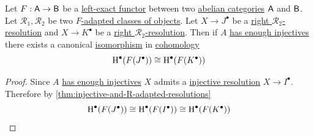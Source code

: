 \documentclass[../../../main]{subfiles}
\begin{document}
\begin{corollary}
  Let \(F: \mathsf{A} \to \mathsf{B}\) be a \hyperref[def:exact-functor]{left-exact functor} between two \hyperref[def:abelian-category]{abelian categories} \(\mathsf{A}\) and \(\mathsf{B}\).
  Let \(\mathcal{R}_{1}, \mathcal{R}_{2}\) be two \hyperref[def:adapted-class-of-objects]{\(F\)-adapted classes of objects}.
  Let \(X \to J^{\bullet}\) be a \hyperref[def:right-R-resolution]{right \(\mathcal{R}_{2}\)-resolution} and \(X \to K^{\bullet}\) be a \hyperref[def:right-R-resolution]{right \(\mathcal{R}_{2}\)-resolution}.
  Then if \(A\) \hyperref[def:enough-injectives-projectives]{has enough injectives} there exists a canonical \hyperref[def:categorical-isomorphism]{isomorphism} in \hyperref[def:cohomology]{cohomology}
  \begin{equation*}
    \operatorname{H}^{\bullet}(F(J^{\bullet})) \cong \operatorname{H}^{\bullet}(F(K^{\bullet}))
  \end{equation*}
\end{corollary}
\begin{proof}
  Since \(A\) \hyperref[def:enough-injectives-projectives]{has enough injectives} \(X\) admits a \hyperref[def:injective-projective-resolution]{injective resolution} \(X \to I^{\bullet}\).
  Therefore by \autoref{thm:injective-and-R-adapted-resolutions}
  \begin{equation*}
    \operatorname{H}^{\bullet}(F(J^{\bullet})) \cong \operatorname{H}^{\bullet}(F(I^{\bullet})) \cong \operatorname{H}^{\bullet}(F(K^{\bullet}))
  \end{equation*}
\end{proof}
\end{document}
